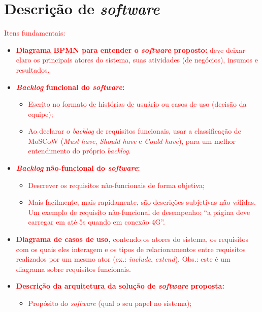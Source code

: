 \section{Descrição de \textit{software}}

\textcolor{red}{Itens fundamentais:}

\begin{itemize}
    \item \textcolor{red}{ \textbf{Diagrama BPMN para entender o \textit{software} proposto:} deve deixar claro os principais atores do sistema, suas atividades (de negócios), insumos e resultados.}
    \item \textcolor{red}{\textbf{\textit{Backlog} funcional do \textit{software}:}}
    \begin{itemize}
        \item \textcolor{red}{ Escrito no formato de histórias de usuário ou casos de uso (decisão da equipe);}
        \item \textcolor{red}{ Ao declarar o \textit{backlog} de requisitos funcionais, usar a  classificação de MoSCoW (\textit{Must have}, \textit{Should have} e \textit{Could have}),  para um melhor entendimento do próprio \textit{backlog}.}
    \end{itemize}
    \item \textcolor{red}{\textbf{ \textit{Backlog} não-funcional do \textit{software}:}}
    \begin{itemize}
        \item \textcolor{red}{ Descrever os requisitos não-funcionais de forma objetiva;}
        \item \textcolor{red}{ Mais facilmente, mais rapidamente, são descrições subjetivas não-válidas. Um exemplo de requisito não-funcional de desempenho: ``a página deve carregar em até 5s quando em conexão 4G''. }
    \end{itemize}
    \item \textcolor{red}{ \textbf{Diagrama de casos de uso,} contendo os atores do sistema, os requisitos com os quais eles interagem e os tipos de relacionamentos entre requisitos realizados por um mesmo ator (ex.: \textit{include}, \textit{extend}). Obs.: este é um diagrama sobre requisitos funcionais.}
    \item \textcolor{red}{ \textbf{Descrição da arquitetura da solução de \textit{software} proposta:}}
    \begin{itemize}
        \item \textcolor{red}{ Propósito do \textit{software} (qual o seu papel no sistema);}

\end{itemize}
\end{itemize}
